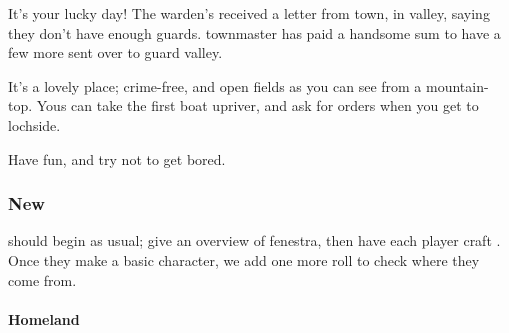 \begin{multicols}{2}
\begin{speechtext}
  It's your lucky day!
  The \gls{warden}'s received a letter from \gls{town}, in \gls{valley}, saying they don't have enough \glspl{guard}.
  \Gls{townmaster} has paid a handsome sum to have a few more sent over to guard \gls{valley}.

  It's a lovely place; crime-free, and open fields as you can see from a mountain-top.
  Yous can take the first boat upriver, and ask for orders when you get to \gls{lochside}.

  Have fun, and try not to get bored.
\end{speechtext}

\subsubsection{New }
should begin as usual; give an overview of \gls{fenestra},%
then have each player craft .%
Once they make a basic character, we add one more roll to check where they come from.

\paragraph{Homeland}


\end{multicols}
